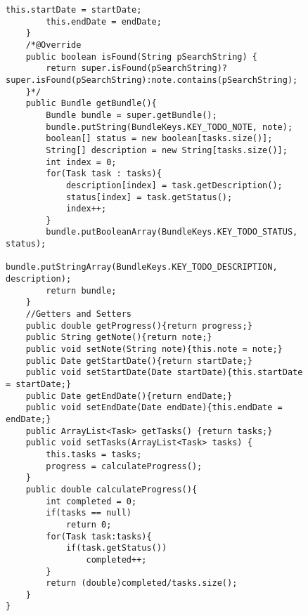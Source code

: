 \begin{figure}[H]
\begin{lstlisting}[caption=Todo (Joscha Nassenstein)]
        this.startDate = startDate;
        this.endDate = endDate;
    }
    /*@Override
    public boolean isFound(String pSearchString) {
        return super.isFound(pSearchString)?super.isFound(pSearchString):note.contains(pSearchString);
    }*/
    public Bundle getBundle(){
        Bundle bundle = super.getBundle();
        bundle.putString(BundleKeys.KEY_TODO_NOTE, note);
        boolean[] status = new boolean[tasks.size()];
        String[] description = new String[tasks.size()];
        int index = 0;
        for(Task task : tasks){
            description[index] = task.getDescription();
            status[index] = task.getStatus();
            index++;
        }
        bundle.putBooleanArray(BundleKeys.KEY_TODO_STATUS, status);
        bundle.putStringArray(BundleKeys.KEY_TODO_DESCRIPTION, description);
        return bundle;
    }
    //Getters and Setters
    public double getProgress(){return progress;}
    public String getNote(){return note;}
    public void setNote(String note){this.note = note;}
    public Date getStartDate(){return startDate;}
    public void setStartDate(Date startDate){this.startDate = startDate;}
    public Date getEndDate(){return endDate;}
    public void setEndDate(Date endDate){this.endDate = endDate;}
    public ArrayList<Task> getTasks() {return tasks;}
    public void setTasks(ArrayList<Task> tasks) {
        this.tasks = tasks;
        progress = calculateProgress();
    }
    public double calculateProgress(){
        int completed = 0;
        if(tasks == null)
            return 0;
        for(Task task:tasks){
            if(task.getStatus())
                completed++;
        }
        return (double)completed/tasks.size();
    }
}
\end{lstlisting}
\end{figure}

